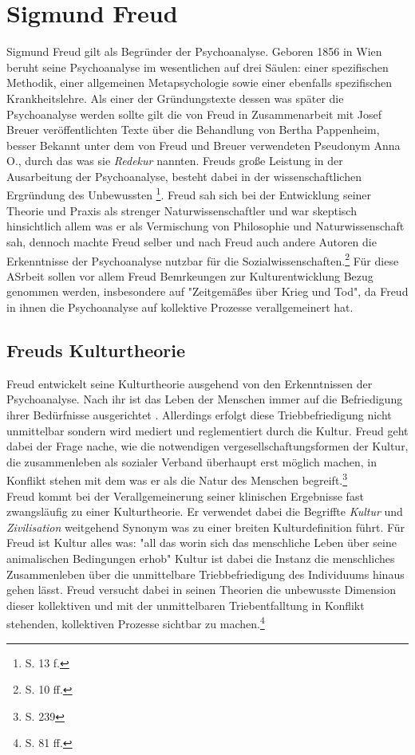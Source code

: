 \documentclass[11pt,a4paper,oneside,numbers=noenddot,bibliography=totocnumbered,DIV=13]{scrartcl}
\begin{document}
\section{Sigmund Freud}
Sigmund Freud gilt als Begründer der Psychoanalyse. Geboren 1856 in Wien beruht seine Psychoanalyse im wesentlichen auf drei Säulen: einer spezifischen Methodik, einer allgemeinen Metapsychologie sowie einer ebenfalls spezifischen Krankheitslehre. 
Als einer der Gründungstexte dessen was später die Psychoanalyse werden sollte gilt die von Freud in Zusammenarbeit mit Josef Breuer veröffentlichten Texte über die Behandlung von Bertha Pappenheim, besser Bekannt unter dem von Freud und Breuer verwendeten Pseudonym Anna O., durch das was sie \textit{Redekur} nannten. Freuds große Leistung in der Ausarbeitung der Psychoanalyse, besteht dabei in der wissenschaftlichen Ergründung des Unbewussten \footnote{\cite{berkel_sigmund_2008}S. 13 f.}.
Freud sah sich bei der Entwicklung seiner Theorie und Praxis als strenger Naturwissenschaftler und war skeptisch hinsichtlich allem was er als Vermischung von Philosophie und Naturwissenschaft sah, dennoch machte Freud selber und nach Freud auch andere Autoren die Erkenntnisse der Psychoanalyse nutzbar für die Sozialwissenschaften.\footnote{\cite{lohmann_freud-handbuch:_2013}S. 10 ff.} Für diese ASrbeit sollen vor allem Freud Bemrkeungen zur Kulturentwicklung Bezug genommen werden, insbesondere auf "Zeitgemäßes über Krieg und Tod", da Freud in ihnen die Psychoanalyse auf kollektive Prozesse verallgemeinert hat.        
\subsection{Freuds Kulturtheorie}
Freud entwickelt seine Kulturtheorie ausgehend von den Erkenntnissen der Psychoanalyse. Nach ihr ist das Leben der Menschen immer auf die Befriedigung ihrer Bedürfnisse ausgerichtet  . Allerdings erfolgt diese Triebbefriedigung nicht unmittelbar sondern wird mediert und reglementiert durch die Kultur. Freud geht dabei der Frage nache, wie die notwendigen vergesellschaftungsformen der Kultur, die zusammenleben als sozialer Verband überhaupt erst möglich machen, in Konflikt stehen  mit dem was er als die Natur des Menschen begreift.\footnote{\cite{lohmann_freud-handbuch:_2013} S. 239} \\
Freud kommt bei der Verallgemeinerung seiner klinischen Ergebnisse fast zwangsläufig zu einer Kulturtheorie. Er verwendet dabei die Begriffte \textit{Kultur} und \textit{Zivilisation} weitgehend Synonym was zu einer breiten Kulturdefinition führt. Für Freud ist Kultur alles was: "all das worin sich das menschliche Leben über seine animalischen Bedingungen erhob"
Kultur ist dabei die Instanz die menschliches Zusammenleben über die unmittelbare Triebbefriedigung des Individuums hinaus gehen lässt. Freud versucht dabei in seinen Theorien die unbewusste Dimension dieser kollektiven und mit der unmittelbaren Triebentfalltung in Konflikt stehenden, kollektiven Prozesse sichtbar zu machen.\footnote{\cite{berkel_sigmund_2008}S. 81 ff.}\\
\end{document}
